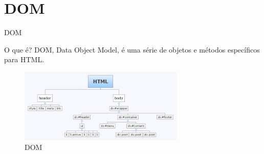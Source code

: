 \section{DOM}
\begin{frame}{DOM}
	\begin{block}{O que é?}
		DOM, Data Object Model, é uma série de objetos e métodos específicos para HTML.
	\end{block}
	\begin{figure}[h!]
	  \caption{DOM}
	  \centering
	    \includegraphics[width=0.7\textwidth]{sections/dom/HTML.png}
	\end{figure}
\end{frame}
